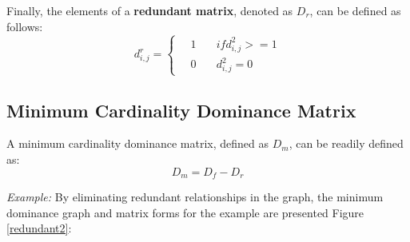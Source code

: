 \documentclass[12pt,english]{report}
\begin{document}
Finally, the elements of a \textbf{redundant matrix}, denoted as $ D_r$, can be defined as follows:
\begin{equation}
d^{r}_{i,j} =
  \begin{cases}
  \quad  1   & \quad if d^{2}_{i,j} >= 1 \\
  \quad  0  & \quad d^{2}_{i,j} = 0 
  \end{cases}   
\end{equation}

\subsection{Minimum Cardinality Dominance Matrix}
A minimum cardinality dominance matrix, defined as $D_m$, can be readily defined as: $$D_m = D_f - D_r $$

\vspace{0.15in}
\noindent \textit{Example:} By eliminating redundant relationships in the graph, the minimum dominance graph and matrix forms for the example are presented Figure \ref{redundant2}:

\begin{figure}
    \begin{floatrow}
    \capbtabbox{%
    \begin{tabular}{l|llllll}
        & 1 & 2 & 3 & 4 & 5 & 6 \\ \hline
        1 & 0 & 0 & 0 & 0 & 0 & 0 \\
        2 & 1 & 0 & 0 & 1 & 1 & 0 \\
        3 & 0 & 1 & 0 & 0 & 0 & 0 \\
        4 & 0 & 0 & 0 & 0 & 0 & 0 \\
        5 & 0 & 0 & 0 & 0 & 0 & 0 \\
        6 & 0 & 1 & 0 & 0 & 0 & 0
    \end{tabular}
        \label{domin_matrix3}%
    }{%
    \caption{Minimum dominance in matrix form}%
    \label{redundant2}
}
\end{floatrow}
\end{figure}
\end{document}
